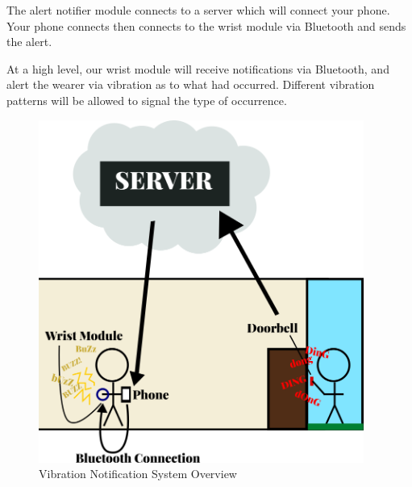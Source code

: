 The alert notifier module connects to a server which will connect your phone. Your phone connects then connects to the wrist module via Bluetooth and sends the alert.

At a high level, our wrist module will receive notifications via Bluetooth, and alert the wearer via vibration as to what had occurred. Different vibration patterns will be allowed to signal the type of occurrence.
\newline
\begin{figure}[h!]
	\centering
   	\includegraphics[width=0.95\textwidth]{project charter latex/images/high-level-system-overview.png}
   	\caption{Vibration Notification System Overview}
\end{figure}